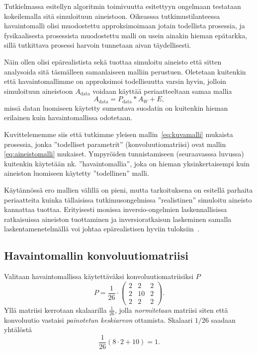 Tutkielmassa esitellyn algoritmin toimivuutta esitettyyn ongelmaan testataan kokeilemalla sitä simuloituun aineistoon.
Oikeasssa tutkimustilanteessa havaintomalli olisi muodostettu approksimoimaan jotain todellista prosessia,
ja fysikaalisesta prosessista muodostettu malli on usein ainakin hieman epätarkka, sillä tutkittava prosessi harvoin tunnetaan aivan täydellisesti.

Näin ollen olisi epärealistista sekä tuottaa simuloitu aineisto että sitten analysoida sitä täsmälleen samanlaiseen malliin perustuen.
Oletetaan kuitenkin että havaintomallimme on approksimoi todellisuutta varsin hyvin,
jolloin simuloituun aineistoon $A_{\text{data}}$ voidaan käyttää periaatteeltaan samaa mallia
\begin{equation}
    \label{eq:aineistomalli}
    A_{\text{data}} = P_{\text{data}} \ast A_W + E,
\end{equation}
missä datan luomiseen käytetty sumentava suodatin on kuitenkin hieman erilainen kuin havaintomallissa odotetaan.

Kuvittelememme siis että tutkimme yleisen mallin~\ref{eq:kuvamalli} mukaista prosessia,
jonka ''todelliset parametrit'' (konvoluutiomatriisi) ovat mallin \ref{eq:aineistomalli} mukaiset.
Ympyröiden tunnistamiseen (seuraavasssa luvussa) kuitenkin käytetään nk. ''havaintomallia'',
joka on hieman yksinkertaisempi kuin aineiston luomiseen käytetty ''todellinen'' malli.

Käytännössä ero mallien välillä on pieni, mutta tarkoituksena on esitellä parhaita periaatteita kuinka tällaisissa tutkimusongelmissa ''realistinen'' simuloitu aineisto kannattaa tuottaa.
Erityisesti monissa inversio-ongelmien laskennallisissa ratkaisuissa aineiston tuottaminen ja inversioratkaisun laskeminen samalla laskentamenetelmällä voi johtaa epärealistisen hyviin tuloksiin~\cite{muellersiltanen12}.

\subsection{Havaintomallin konvoluutiomatriisi}
\label{sub:mallin_konvoluutiomatriisi}

Valitaan havaintomallissa käytettäväksi konvoluutiomatriisiksi $P$
\begin{equation}
    P = \frac{1}{26} \cdot
    \begin{pmatrix}
        2 & 2 & 2 \\
        2 & 10 & 2 \\
        2 & 2 & 2
    \end{pmatrix}.
\end{equation}
Yllä matriisi kerrotaan skalaarilla $\frac{1}{26}$, jolla \emph{normitetaan} matriisi siten että konvoluutio vastaisi \emph{painotetun keskiarvon} ottamista.
Skalaari $1/26$ saadaan yhtälöstä \[\frac{1}{26}(8\cdot2 + 10) = 1.\]


